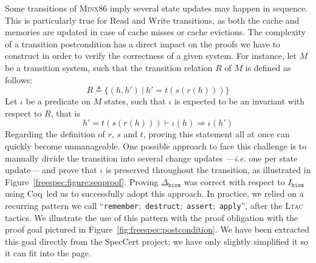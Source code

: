 \documentclass[oneside,a4paper]{memoir}
\theoremstyle{break}
\begin{document}
Some transitions of {\scshape Minx86} imply several state updates may happen in
sequence.
%
This is particularly true for \( \mathrm{Read} \) and \( \mathrm{Write} \)
transitions, as both the cache and memories are updated in case of cache misses
or cache evictions.
%
The complexity of a transition postcondition has a direct impact on the proofs
we have to construct in order to verify the correctness of a given system.
%
For instance, let \( M \) be a transition system, such that the transition
relation \( R \) of \( M \) is defined as follows:
%
\[
  R \triangleq \{ (h, h')\ |\ h' = t(s(r(h))) \}
\]
%
Let \( \iota \) be a predicate on \( M \) states, such that \( \iota \) is
expected to be an invariant with respect to \( R \), that is
%
\[
  h' = t(s(r(h))) \vdash \iota(h) \Rightarrow \iota(h')
\]
%
Regarding the definition of \( r \), \( s \) and \( t \), proving this statement
all at once can quickly become unmanageable.
%
One possible approach to face this challenge is to manually divide the
transition into several change updates ---\emph{i.e.} one per state update---
and prove that \( \iota \) is preserved throughout the transition, as
illustrated in Figure~\ref{freespec:figure:seqproof}.
%
Proving \( \Delta_{\mathtt{bios}} \) was correct with respect to
\( I_{\mathtt{bios}} \) using Coq\,\cite{letan2016speccertcode} led us to
successfully adopt this approach.
%
In practice, we relied on a recurring pattern we call
``\texttt{remember};~\texttt{destruct};~\texttt{assert};~\texttt{apply}'', after
the {\scshape Ltac} tactics.
%
We illustrate the use of this pattern with the proof obligation with the proof
goal pictured in Figure~\ref{fig:freespec:postcondition}.
%
We have been extracted this goal directly from the SpecCert project; we have
only slightly simplified it so it can fit into the page.
%
\end{document}

